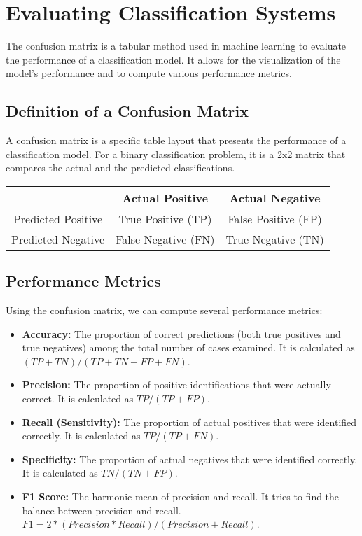 \chapter{Evaluating Classification Systems}

The confusion matrix is a tabular method used in machine learning to evaluate the performance of a classification model. It allows for the visualization of the model's performance and to compute various performance metrics.

\section{Definition of a Confusion Matrix}

A confusion matrix is a specific table layout that presents the performance of a classification model. For a binary classification problem, it is a 2x2 matrix that compares the actual and the predicted classifications.

\begin{table}[h]
\centering
\begin{tabular}{|c|c|c|}
\hline
 & Actual Positive & Actual Negative \\
\hline
Predicted Positive & True Positive (TP) & False Positive (FP) \\
\hline
Predicted Negative & False Negative (FN) & True Negative (TN) \\
\hline
\end{tabular}
\end{table}

\section{Performance Metrics}

Using the confusion matrix, we can compute several performance metrics:

\begin{itemize}
\item \textbf{Accuracy:} The proportion of correct predictions (both true positives and true negatives) among the total number of cases examined. It is calculated as $(TP + TN) / (TP + TN + FP + FN)$.

\item \textbf{Precision:} The proportion of positive identifications that were actually correct. It is calculated as $TP / (TP + FP)$.

\item \textbf{Recall (Sensitivity):} The proportion of actual positives that were identified correctly. It is calculated as $TP / (TP + FN)$.

\item \textbf{Specificity:} The proportion of actual negatives that were identified correctly. It is calculated as $TN / (TN + FP)$.

\item \textbf{F1 Score:} The harmonic mean of precision and recall. It tries to find the balance between precision and recall. $F1 = 2 * (Precision * Recall) / (Precision + Recall)$.
\end{itemize}

\
